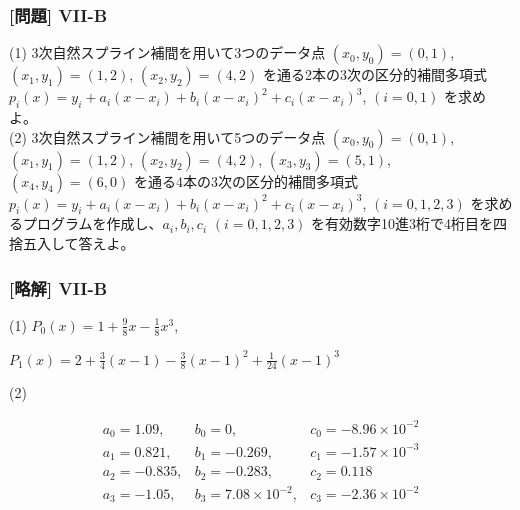 \documentclass[dvipdfmx,aspectratio=169,20pt]{beamer}
\newcommand{\myfontsetting}[3]{{\fontsize{#1}{#2}\selectfont #3}}
\begin{document}
\graphicspath{{figs/}}

\begin{frame}
\frametitle{[問題] V\hspace{-.1em}I\hspace{-.1em}I-B}

\myfontsetting{12pt}{12pt}{
(1) 3次自然スプライン補間を用いて3つのデータ点 $(x_0,y_0)=(0,1)$, $(x_1,y_1)=(1,2)$, $(x_2,y_2)=(4,2)$ を通る2本の3次の区分的補間多項式 $p_i(x) = y_i + a_i (x-x_i) + b_i (x-x_i)^2 + c_i (x-x_i)^3$, $(i=0,1)$ を求めよ。%
}\\
\myfontsetting{12pt}{12pt}{
(2) 3次自然スプライン補間を用いて5つのデータ点 $(x_0,y_0)=(0,1)$, $(x_1,y_1)=(1,2)$, $(x_2,y_2)=(4,2)$, $(x_3,y_3)=(5,1)$, $(x_4,y_4)=(6,0)$ を通る4本の3次の区分的補間多項式 $p_i(x) = y_i + a_i (x-x_i) + b_i (x-x_i)^2 + c_i (x-x_i)^3$, $(i=0,1,2,3)$ を求めるプログラムを作成し、$a_i, b_i, c_i$ $(i=0,1,2,3)$ を有効数字10進3桁で4桁目を四捨五入して答えよ。
}
\end{frame}
\begin{frame}
\frametitle{[略解] V\hspace{-.1em}I\hspace{-.1em}I-B}
(1) $P_0(x)=1+\frac{9}{8}x - \frac{1}{8}x^3$,

\vspace{2mm}

$P_1(x)=2+\frac{3}{4}(x-1)-\frac{3}{8}(x-1)^2+\frac{1}{24}(x-1)^3$

\vspace{5mm}

(2) 

\vspace{-5mm}
\myfontsetting{18pt}{18pt}{
\[
\begin{matrix}
a_0 = 1.09, & b_0 = 0, &c_0 = -8.96\times 10^{-2}\\
a_1 = 0.821, & b_1 =-0.269, & c_1 = -1.57 \times 10^{-3}\\
a_2 = -0.835, & b_2 = -0.283, & c_2 = 0.118\\
a_3 = -1.05, & b_3 = 7.08\times 10^{-2}, & c_3 = -2.36\times 10^{-2}
\end{matrix}
\]
}

\end{frame}
\end{document}
